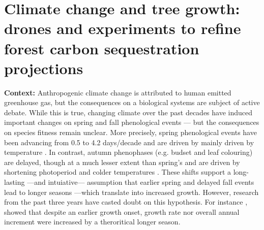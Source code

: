 \documentclass[12pt]{article}
\begin{document}

\section*{Climate change and tree growth: drones and experiments to refine forest carbon sequestration projections}



\textbf {Context:} Anthropogenic climate change is attributed to human emitted greenhouse gas, but the consequences on a biological systems are subject of active debate. While this is true, changing climate over the past decades have induced important changes on spring and fall phenological events --- but the consequences on species fitness remain unclear. More precisely, spring phenological events have been advancing from 0.5 \citep{wolfe_climate_2005} to 4.2 days/decade \citep{chmielewski_response_2001,fu_recent_2014} and are driven by mainly driven by temperature \citep{chuine_why_2010,cleland_shifting_2007,penuelas_responses_2001}. In contrast, autumn phenophases (e.g. budset and leaf colouring) are delayed, though at a much lesser extent than spring's \citep{gallinat_autumn_2015,jeong_macroscale_2014} and are driven by shortening photoperiod \citep{cooke_dynamic_2012,flynn_temperature_2018,korner_phenology_2010} and colder temperatures \citep{cooke_dynamic_2012,delpierre_temperate_2016}. These shifts support a long-lasting ---and intuiative---  assumption that earlier spring and delayed fall events lead to longer seasons ---which translate into increased growth. However, research from the past three years have casted doubt on this hypothesis. For instance \citep{dow_warm_2022}, showed that despite an earlier growth onset, growth rate nor overall annual increment were increased by a theroritical longer season. 
\end{document}
